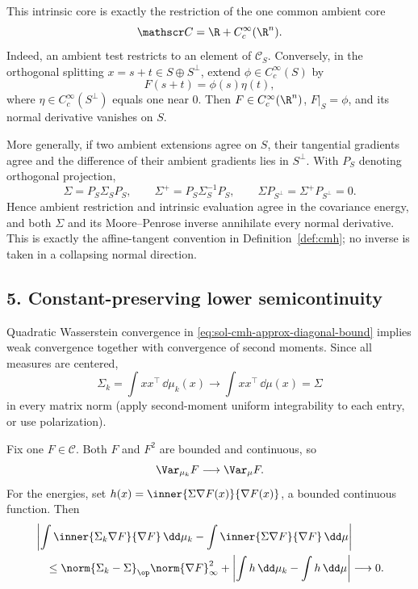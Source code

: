 \documentclass[../main.tex]{subfiles}
\begin{document}
This intrinsic core is exactly the restriction of the one common ambient core
\[
  \mathscr C=\R+C_c^\infty(\R^n).
  \label{eq:sol-cmh-approx-ambient-core}
\]
Indeed, an ambient test restricts to an element of $\mathscr C_S$.  Conversely, in the
orthogonal splitting $x=s+t\in S\oplus S^\perp$, extend
$\phi\in C_c^\infty(S)$ by
\[
  F(s+t)=\phi(s)\eta(t),
\]
where $\eta\in C_c^\infty(S^\perp)$ equals one near $0$.  Then $F\in C_c^\infty(\R^n)$,
$F|_S=\phi$, and its normal derivative vanishes on $S$.

More generally, if two ambient extensions agree on $S$, their tangential gradients agree and
the difference of their ambient gradients lies in $S^\perp$.  With $P_S$ denoting orthogonal
projection,
\begin{equation}
  \Sigma=P_S\Sigma_SP_S,
  \qquad
  \Sigma^+=P_S\Sigma_S^{-1}P_S,
  \qquad
  \Sigma P_{S^\perp}=\Sigma^+P_{S^\perp}=0.
  \label{eq:sol-cmh-approx-normal-annihilation}
\end{equation}
Hence ambient restriction and intrinsic evaluation agree in the covariance energy, and both
$\Sigma$ and its Moore--Penrose inverse annihilate every normal derivative.  This is exactly the
affine-tangent convention in Definition~\ref{def:cmh}; no inverse is taken in a collapsing
normal direction.

\subsection*{5. Constant-preserving lower semicontinuity}

Quadratic Wasserstein convergence in
\eqref{eq:sol-cmh-approx-diagonal-bound} implies weak convergence together with convergence of
second moments.  Since all measures are centered,
\begin{equation}
  \Sigma_k=\int xx^\top\,\dd\mu_k(x)
  \longrightarrow
  \int xx^\top\,\dd\mu(x)=\Sigma
  \label{eq:sol-cmh-approx-covariance-convergence}
\end{equation}
in every matrix norm (apply second-moment uniform integrability to each entry, or use
polarization).

Fix one $F\in\mathscr C$.  Both $F$ and $F^2$ are bounded and continuous, so
\begin{equation}
  \Var_{\mu_k}F\longrightarrow\Var_\mu F.
  \label{eq:sol-cmh-approx-variance-convergence}
\end{equation}
For the energies, set
$h(x)=\inner{\Sigma\nabla F(x)}{\nabla F(x)}$, a bounded continuous function.  Then
\begin{align}
 &\left|\int\inner{\Sigma_k\nabla F}{\nabla F}\,\dd\mu_k
          -\int\inner{\Sigma\nabla F}{\nabla F}\,\dd\mu\right| \notag\\
 &\quad\le
   \norm{\Sigma_k-\Sigma}_\op\norm{\nabla F}_\infty^2
   +\left|\int h\,\dd\mu_k-\int h\,\dd\mu\right|
   \longrightarrow0.
  \label{eq:sol-cmh-approx-energy-convergence}
\end{align}
\end{document}
